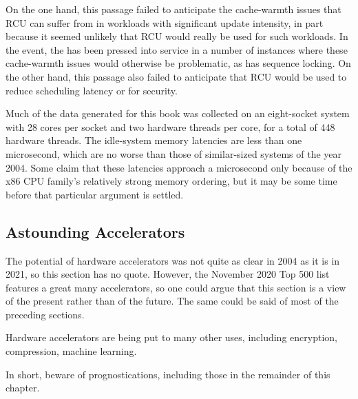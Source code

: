 On the one hand, this passage failed to anticipate the cache-warmth
issues that RCU can suffer from in workloads with significant update
intensity, in part because it seemed unlikely that RCU would really
be used for such workloads.
In the event, the  has been pressed into
service in a number of instances where these cache-warmth issues would
otherwise be problematic, as has sequence locking.
On the other hand, this passage also failed to anticipate that
RCU would be used to reduce scheduling latency or for security.

Much of the data generated for this book was collected on an eight-socket
system with 28 cores per socket and two hardware threads per core, for
a total of 448 hardware threads.
The idle-system memory latencies are less than one microsecond, which
are no worse than those of similar-sized systems of the year 2004.
Some claim that these latencies approach a microsecond only because of
the x86 CPU family's relatively strong memory ordering, but it may be
some time before that particular argument is settled.

\subsection{Astounding Accelerators}
\label{sec:future:Astounding Accelerators}

The potential of hardware accelerators was not quite as clear in 2004
as it is in 2021, so this section has no quote.
However, the November 2020 Top 500 list~\cite{Top500} features a great
many accelerators, so one could argue that this section is a view of
the present rather than of the future.
The same could be said of most of the preceding sections.

Hardware accelerators are being put to many other uses, including
encryption, compression, machine learning.

In short, beware of prognostications, including those in the remainder
of this chapter.
